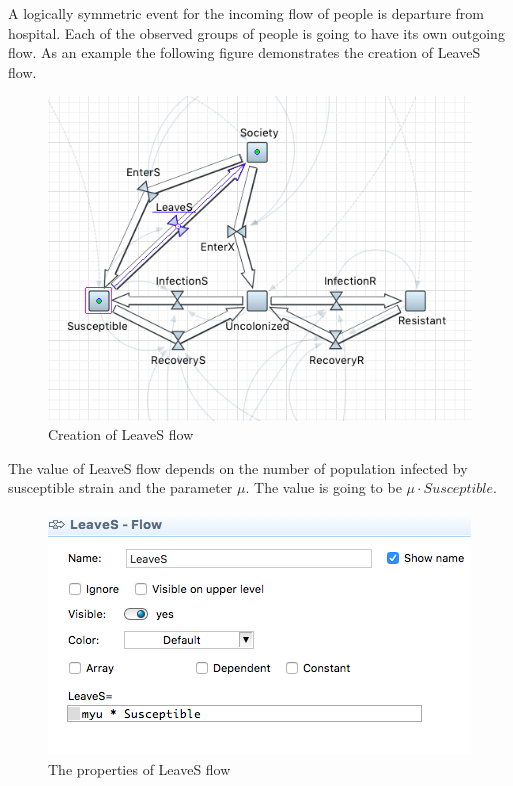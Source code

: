 A logically symmetric event for the incoming flow of people is departure from hospital. Each of the observed groups of people is going to have its own outgoing flow. As an example the following figure demonstrates the creation of LeaveS flow.

\begin{figure}[H]
  \centering
  \includegraphics[height=0.5\text width]{img/screens/society/society12}
  \caption{Creation of LeaveS flow}
\end{figure}

The value of LeaveS flow depends on the number of population infected by susceptible strain and the parameter $\mu$. The value is going to be $\mu \cdot Susceptible$.

\begin{figure}[H]
  \centering
  \includegraphics[height=0.3\text width]{img/screens/society/society18}
  \caption{The properties of LeaveS flow}
\end{figure}

